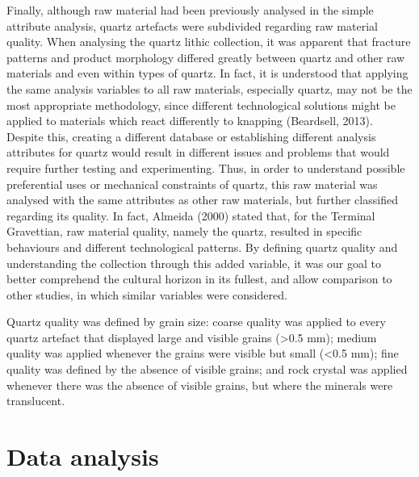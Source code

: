 \documentclass[12pt,twoside]{reedthesis}
\begin{document}
Finally, although raw material had been previously analysed in the simple attribute analysis, quartz artefacts were subdivided regarding raw material quality. When analysing the quartz lithic collection, it was apparent that fracture patterns and product morphology differed greatly between quartz and other raw materials and even within types of quartz. In fact, it is understood that applying the same analysis variables to all raw materials, especially quartz, may not be the most appropriate methodology, since different technological solutions might be applied to materials which react differently to knapping (Beardsell, 2013). Despite this, creating a different database or establishing different analysis attributes for quartz would result in different issues and problems that would require further testing and experimenting. Thus, in order to understand possible preferential uses or mechanical constraints of quartz, this raw material was analysed with the same attributes as other raw materials, but further classified regarding its quality. In fact, Almeida (2000) stated that, for the Terminal Gravettian, raw material quality, namely the quartz, resulted in specific behaviours and different technological patterns. By defining quartz quality and understanding the collection through this added variable, it was our goal to better comprehend the cultural horizon in its fullest, and allow comparison to other studies, in which similar variables were considered.

Quartz quality was defined by grain size: coarse quality was applied to every quartz artefact that displayed large and visible grains (\textgreater0.5 mm); medium quality was applied whenever the grains were visible but small (\textless0.5 mm); fine quality was defined by the absence of visible grains; and rock crystal was applied whenever there was the absence of visible grains, but where the minerals were translucent.

\hypertarget{data-analysis}{%
\section{Data analysis}\label{data-analysis}}
\end{document}
